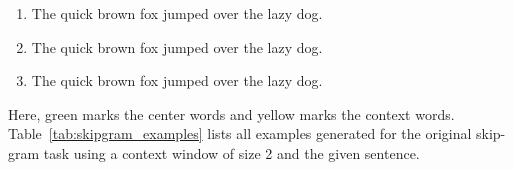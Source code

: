 \documentclass[11pt,a4paper]{article}
\begin{document}
\begin{enumerate}[label=(\alph*)]
\begin{enumerate}[label=(\arabic*)]
              \item The quick brown fox \colorbox{yellow!30}{jumped} \colorbox{yellow!30}{over} \colorbox{green!30}{the} \colorbox{yellow!30}{lazy} \colorbox{yellow!30}{dog}.
              \item The quick brown fox jumped \colorbox{yellow!30}{over} \colorbox{yellow!30}{the} \colorbox{green!30}{lazy} \colorbox{yellow!30}{dog}.
              \item The quick brown fox jumped over \colorbox{yellow!30}{the} \colorbox{yellow!30}{lazy} \colorbox{green!30}{dog}.
          \end{enumerate}
          Here, green marks the center words and yellow marks the context words.
          Table~\ref{tab:skipgram_examples} lists all examples generated for the
          original skip-gram task using a context window of size 2 and the
          given sentence.
\end{enumerate}
\end{document}
